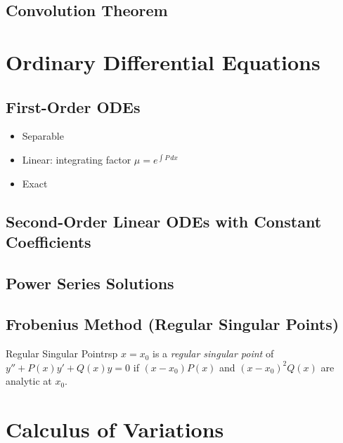 \documentclass[11pt, letterpaper]{article}
\theoremstyle{plain}
\begin{document}
\subsection{Convolution Theorem}


\section{Ordinary Differential Equations} %

\subsection{First-Order ODEs}
\begin{itemize}
  \item Separable
  \item Linear: integrating factor $\mu = e^{\int P\,dx}$
  \item Exact
\end{itemize}

\subsection{Second-Order Linear ODEs with Constant Coefficients}

\subsection{Power Series Solutions}

\subsection{Frobenius Method (Regular Singular Points)}

\begin{definition}{Regular Singular Point}{rsp}
  $x = x_0$ is a \emph{regular singular point} of
  $y'' + P(x)y' + Q(x)y = 0$ if $(x-x_0)P(x)$ and $(x-x_0)^2 Q(x)$
  are analytic at $x_0$.
\end{definition}



\section{Calculus of Variations}          %
\end{document}
